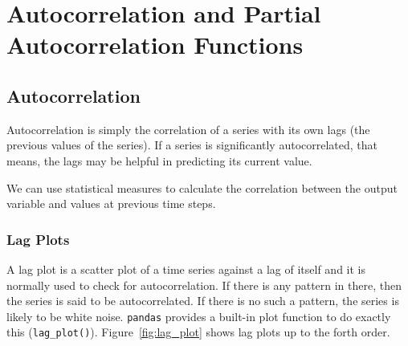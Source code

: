 \section{Autocorrelation and Partial Autocorrelation Functions}
\label{autocorrelation-and-partial-autocorrelation-functions}

\subsection{Autocorrelation}\label{autocorrelation}

Autocorrelation is simply the correlation of a series with its own
lags (the previous values of the series). If a series is
significantly autocorrelated, that means, the lags may be helpful in
predicting its current value.

We can use statistical measures to calculate the correlation between the
output variable and values at previous time steps. 

\subsubsection{Lag Plots}\label{lag-plots}

A lag plot is a scatter plot of a time series against a lag of itself
and it is normally used to check for autocorrelation. If there is any
pattern in there, then the series is said to be autocorrelated. 
If there is no such a pattern, the series is likely to be
white noise.
\texttt{pandas} provides a built-in plot function to do exactly this (\texttt{lag\_plot()}). Figure~\ref{fig:lag_plot} shows lag plots up to 
the forth order.

